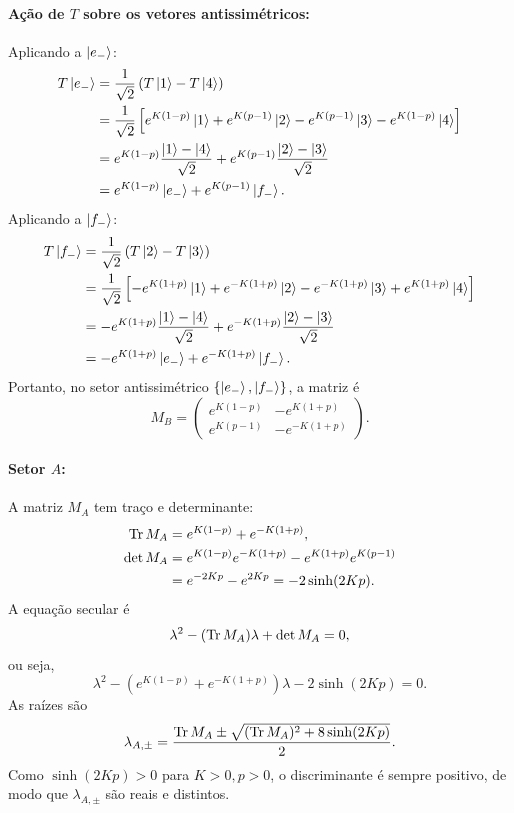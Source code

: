 \documentclass[11pt,a4paper]{article}
\begin{document}
\paragraph{Ação de \(T\) sobre os vetores antissimétricos:}
%
Aplicando a \(\ket{e_-}\):
\begin{align}
    T\ket{e_-} &= \frac{1}{\sqrt{2}} \left( T\ket{1} - T\ket{4} \right) \\
    &= \frac{1}{\sqrt{2}} \left[ e^{K(1-p)}\ket{1} + e^{K(p-1)}\ket{2} - e^{K(p-1)}\ket{3} - e^{K(1-p)}\ket{4} \right] \\
    &= e^{K(1-p)} \frac{\ket{1} - \ket{4}}{\sqrt{2}} + e^{K(p-1)} \frac{\ket{2} - \ket{3}}{\sqrt{2}} \\
    &= e^{K(1-p)} \ket{e_-} + e^{K(p-1)} \ket{f_-}.
\end{align}
%
Aplicando a \(\ket{f_-}\):
%
\begin{align}
    T\ket{f_-} &= \frac{1}{\sqrt{2}} \left( T\ket{2} - T\ket{3} \right) \\
    &= \frac{1}{\sqrt{2}} \left[ - e^{K(1+p)}\ket{1} + e^{-K(1+p)}\ket{2} - e^{-K(1+p)}\ket{3} + e^{K(1+p)}\ket{4} \right] \\
    &= -e^{K(1+p)} \frac{\ket{1} - \ket{4}}{\sqrt{2}} + e^{-K(1+p)} \frac{\ket{2} - \ket{3}}{\sqrt{2}} \\
    &= -e^{K(1+p)} \ket{e_-} + e^{-K(1+p)} \ket{f_-}.
\end{align}
%
Portanto, no setor antissimétrico \(\{ \ket{e_-}, \ket{f_-} \}\), a matriz é
%
\begin{equation}
    M_B =
    \begin{pmatrix}
        e^{K(1-p)} & -e^{K(1+p)} \\
        e^{K(p-1)} & -e^{-K(1+p)}
    \end{pmatrix}.
    \label{eq:MB}
\end{equation}
%
\paragraph{Setor \(A\):} A matriz \(M_A\) tem traço e determinante:
%
\begin{align}
    \Tr M_A &= e^{K(1-p)} + e^{-K(1+p)}, \\
    \det M_A &= e^{K(1-p)} e^{-K(1+p)} - e^{K(1+p)} e^{K(p-1)} \\
    &= e^{-2Kp} - e^{2Kp} = -2\sinh(2Kp).
\end{align}
%
A equação secular é
%
\begin{equation}
    \lambda^2 - (\Tr M_A) \lambda + \det M_A = 0,
\end{equation}
%
ou seja,
%
\begin{equation}
    \lambda^2 - \left( e^{K(1-p)} + e^{-K(1+p)} \right) \lambda - 2\sinh(2Kp) = 0.
\end{equation}
%
As raízes são
%
\begin{equation}
    \lambda_{A,\pm} = \frac{\Tr M_A \pm \sqrt{(\Tr M_A)^2 + 8\sinh(2Kp)}}{2}.
    \label{eq:lambdas_A}
\end{equation}
%
Como \(\sinh(2Kp) > 0\) para \(K>0, p>0\), o discriminante é sempre positivo, de modo que \(\lambda_{A,\pm}\) são reais e distintos.
%
\end{document}
